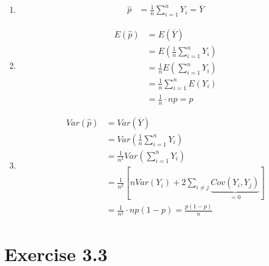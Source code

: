 \documentclass[
]{book}
\begin{document}
\begin{enumerate}
\def\labelenumi{\alph{enumi}.}
\item
  \begin{align}
       \widehat{p}
       & = \frac{1}{n} \sum_{i=1}^{n}Y_i
         = \overline{Y}
   \end{align}
\item
  \begin{align}
        E\left( \widehat{p} \right)
        & = E\left( \overline{Y} \right) \\
        & = E\left( \frac{1}{n}\sum_{i=1}^{n} Y_i \right) \\
        & = \frac{1}{n} E\left( \sum_{i=1}^{n} Y_i \right) \\
        & = \frac{1}{n} \sum_{i=1}^{n} E(Y_i) \\
        & = \frac{1}{n}\cdot np
          = p
    \end{align}
\item
  \begin{align}
        Var\left( \widehat{p} \right)
        & = Var\left( \overline{Y} \right) \\
        & = Var\left( \frac{1}{n}\sum_{i=1}^{n}Y_i \right) \\
        & = \frac{1}{n^2} Var\left( \sum_{i=1}^{n}Y_i \right) \\
        & = \frac{1}{n^2} \left[ nVar(Y_i) + 2\sum_{i\neq j} \underbrace{Cov (Y_i, Y_j)}_{=0} \right] \\
        & = \frac{1}{n^2} \cdot np(1-p) 
          = \frac{p(1-p)}{n}
    \end{align}
\end{enumerate}

\hypertarget{exercise-3.3}{%
\section{Exercise 3.3}\label{exercise-3.3}}
\end{document}
